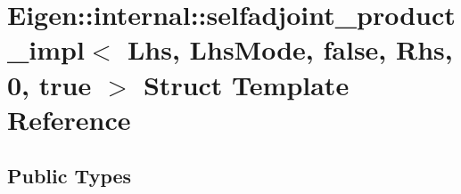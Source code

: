 \hypertarget{struct_eigen_1_1internal_1_1selfadjoint__product__impl_3_01_lhs_00_01_lhs_mode_00_01false_00_01_rhs_00_010_00_01true_01_4}{}\section{Eigen\+:\+:internal\+:\+:selfadjoint\+\_\+product\+\_\+impl$<$ Lhs, Lhs\+Mode, false, Rhs, 0, true $>$ Struct Template Reference}
\label{struct_eigen_1_1internal_1_1selfadjoint__product__impl_3_01_lhs_00_01_lhs_mode_00_01false_00_01_rhs_00_010_00_01true_01_4}
\subsection*{Public Types}
